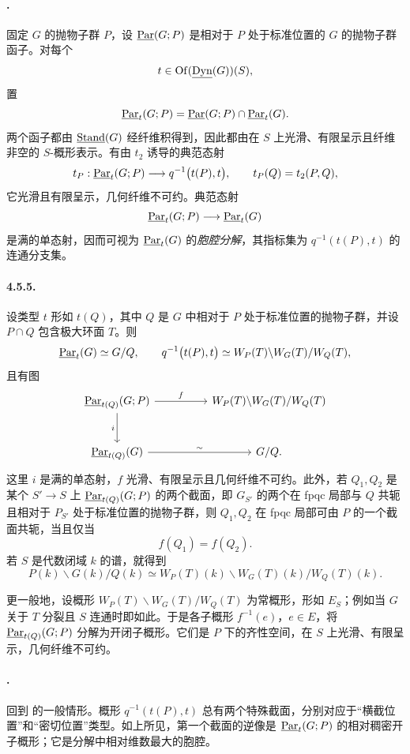 \paragraph{.}
固定 \(G\) 的抛物子群 \(P\)，设 \(\underline{\operatorname{Par}}(G;P)\) 是相对于 \(P\) 处于标准位置的 \(G\) 的抛物子群函子。对每个
\[
 t\in\operatorname{Of}(\underline{\operatorname{Dyn}}(G))(S),
\]
置
\[
 \underline{\operatorname{Par}}_t(G;P)=\underline{\operatorname{Par}}(G;P)\cap\underline{\operatorname{Par}}_t(G).
\]
两个函子都由 \(\underline{\operatorname{Stand}}(G)\) 经纤维积得到，因此都由在 \(S\) 上光滑、有限呈示且纤维非空的 \(S\)-概形表示。有由 \(t_2\) 诱导的典范态射
\[
 t_P:\underline{\operatorname{Par}}_t(G;P)\longrightarrow q^{-1}\bigl(t(P),t\bigr),
 \qquad t_P(Q)=t_2(P,Q),
\]
它光滑且有限呈示，几何纤维不可约。典范态射
\[
 \underline{\operatorname{Par}}_t(G;P)\longrightarrow\underline{\operatorname{Par}}_t(G)
\]
是满的单态射，因而可视为 \(\underline{\operatorname{Par}}_t(G)\) 的\emph{胞腔分解}，其指标集为 \(q^{-1}(t(P),t)\) 的连通分支集。

\paragraph{4.5.5.}
设类型 \(t\) 形如 \(t(Q)\)，其中 \(Q\) 是 \(G\) 中相对于 \(P\) 处于标准位置的抛物子群，并设 \(P\cap Q\) 包含极大环面 \(T\)。则
\[
 \underline{\operatorname{Par}}_t(G)\simeq G/Q,\qquad
 q^{-1}\bigl(t(P),t\bigr)
 \simeq W_P(T)\backslash W_G(T)/W_Q(T),
\]
且有图
\[
\begin{tikzcd}[column sep=huge,row sep=large]
 \Par_{t(Q)}(G;P)
   \arrow[r,"f"] \arrow[d,"i"']
   & W_P(T)\backslash W_G(T)/W_Q(T)\\
 \Par_{t(Q)}(G) \arrow[r,"\sim"]
   & G/Q .
\end{tikzcd}
\]
这里 \(i\) 是满的单态射，\(f\) 光滑、有限呈示且几何纤维不可约。此外，若 \(Q_1,Q_2\) 是某个 \(S'\to S\) 上 \(\underline{\operatorname{Par}}_{t(Q)}(G;P)\) 的两个截面，即 \(G_{S'}\) 的两个在 fpqc 局部与 \(Q\) 共轭且相对于 \(P_{S'}\) 处于标准位置的抛物子群，则 \(Q_1,Q_2\) 在 fpqc 局部可由 \(P\) 的一个截面共轭，当且仅当
\[
 f(Q_1)=f(Q_2).
\]
若 \(S\) 是代数闭域 \(k\) 的谱，就得到
\[
 P(k)\backslash G(k)/Q(k)
 \simeq
 W_P(T)(k)\backslash W_G(T)(k)/W_Q(T)(k).
\]

更一般地，设概形 \(W_P(T)\backslash W_G(T)/W_Q(T)\) 为常概形，形如 \(E_S\)；例如当 \(G\) 关于 \(T\) 分裂且 \(S\) 连通时即如此。于是各子概形 \(f^{-1}(e)\)，\(e\in E\)，将 \(\underline{\operatorname{Par}}_{t(Q)}(G;P)\) 分解为开闭子概形。它们是 \(P\) 下的齐性空间，在 \(S\) 上光滑、有限呈示，几何纤维不可约。

\paragraph{.}
回到  的一般情形。概形 \(q^{-1}(t(P),t)\) 总有两个特殊截面，分别对应于“横截位置”和“密切位置”类型。如上所见，第一个截面的逆像是 \(\underline{\operatorname{Par}}_t(G;P)\) 的相对稠密开子概形；它是分解中相对维数最大的胞腔。

